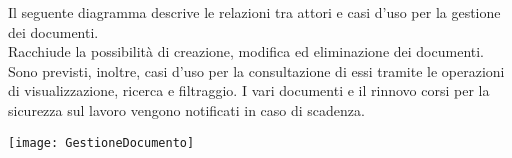 \documentclass[a4paper]{report}
\begin{document}
\clearpage


Il seguente diagramma descrive le relazioni tra attori e casi d’uso per la gestione dei documenti.\\ 
Racchiude la possibilità di creazione, modifica ed eliminazione dei documenti. Sono previsti, inoltre, casi d’uso per la consultazione di essi tramite le operazioni di visualizzazione, ricerca e filtraggio. I vari documenti e il rinnovo corsi per la sicurezza sul lavoro vengono notificati in caso di scadenza.


\begin{figure*}[ht]
    \centering
    \texttt{[image: GestioneDocumento]}
\end{figure*}

\clearpage
\renewcommand{\arraystretch}{1.9}
\end{document}
